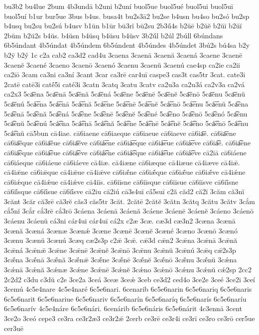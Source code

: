 {bu3b2
bu4lue
2bum
4b3undā
b2uni
b2uní
buol5ue
buol5ué
buol5ui
buol5uī
buol5uí
b1ur
bur5ue
3bus
b4us.
busa4t
bu2s3ā2
bu2se
b4usn
bu4so
bu2só
bu2sp
b4usq
bu2su
bu2sú
b4usv
b1ūn
b1ūr
bū3rĭ
bū2su
2b3ū́4s
b2ŭē
b2ŭĕ
b2ŭī
b2ŭĭ
2bŭm
b2ŭ2s
b4ŭs.
b4ŭsn
b4ŭsq
b4ŭsu
b4ŭsv
3b2ŭ́l
b2úl
2búll
6búndans
6b5úndant
4b5úndat
4b5úndem
6b5úndent
4b5úndes
4b5úndet
3bú2s
bú4sa
b2y
b2ȳ
b2ý
1c
c2a
cab2
ca3d2
cad4u
3caena
3caenā
3caenă
3caená
3caene
3caenē
3caenĕ
3caené
3caeno
3caenō
3caenó
3caenu
3caenŭ
3caenú
cae4sp
ca2ie
ca2ii
ca2iō
3cam
ca3ni
ca3ní
3cant
3car
ca3rē
car4uī
caspe3
cas3t
cas5tr
3cat.
cate3i
2catē
catē3i
catḗ5i
caté3i
3catn
3catq
3catu
3catv
ca2u3a
ca2u3á
ca2v3a
ca2vá
ca2x3
5ca͞ena
5ca͞enā
5ca͞enă
5ca͞ená
5ca͞ene
5ca͞enē
5ca͞enĕ
5ca͞enō
5ca͞enu
5ca͞enŭ
5ca͞enú
5cá͞ena
5cá͞enā
5cá͞enă
5cá͞ene
5cá͞enē
5cá͞enĕ
5cá͞enō
5cá͞enu
5cá͞enŭ
5ca͡ena
5ca͡enā
5ca͡enă
5ca͡ená
5ca͡ene
5ca͡enē
5ca͡enĕ
5ca͡ené
5ca͡eno
5ca͡enō
5ca͡enó
5ca͡enu
5ca͡enŭ
5ca͡enú
5cá͡ena
5cá͡enā
5cá͡enă
5cá͡ene
5cá͡enē
5cá͡enĕ
5cá͡eno
5cá͡enō
5cá͡enu
5cá͡enŭ
cā5bun
cā4iae.
cā6iaene
cā6iaeque
cā6iaeue
cā6iaeve
cā6ia͞e.
cā6ia͞ene
cā6ia͞eque
cā6ia͞eue
cā6ia͞eve
cā6iá͞ene
cā6iá͞eque
cā6iá͞eue
cā6iá͞eve
cā6ia͡e.
cā6ia͡ene
cā6ia͡eque
cā6ia͡eue
cā6ia͡eve
cā6iá͡ene
cā6iá͡eque
cā6iá͡eue
cā6iá͡eve
cā2iā
cā6iáene
cā6iáeque
cā6iáeue
cā6iáeve
cā4iæ.
cā4iæne
cā6iæque
cā4iæue
cā4iæve
cā4iǣ.
cā4iǣne
cā6iǣque
cā4iǣue
cā4iǣve
cā6iǣ́ne
cā6iǣ́que
cā6iǣ́ue
cā6iǣ́ve
cā4iǽne
cā6iǽque
cā4iǽue
cā4iǽve
cā4iīs.
cā6iīsne
cā6iīsque
cā6iīsue
cā6iīsve
cā6iī́sne
cā6iī́sque
cā6iī́sue
cā6iī́sve
cā2iu
cā2iú
cā3s4uī
cā́5suī
c2ă
căd2
că2ĭ
3căm
că3nĭ
3cănt
3căr
că3rē
că3rĕ
căs3
căs5tr
3căt.
2cătē
2cătĕ
3cătn
3cătq
3cătu
3cătv
3cắm
cắ5nĭ
3cắr
cắ3rē
cắ3rō
3cáena
3cáenā
3cáenă
3cáene
3cáenē
3cáenĕ
3cáeno
3cáenō
3cáenu
3cáenŭ
cá3ni
cár4ui
cár4uī
cá2x
c2æ
3cæ.
cæ3d
cæ3n2
3cæna
3cænā
3cænă
3cæná
3cænæ
3cænǽ
3cæne
3cænē
3cænĕ
3cæné
3cæno
3cænō
3cænó
3cænu
3cænŭ
3cænú
3cæq
cæ2s3p
c2ǣ
3cǣ.
cǣ3d
cǣn2
3cǣna
3cǣnā
3cǣnă
3cǣná
3cǣnǣ
3cǣne
3cǣnē
3cǣnĕ
3cǣnō
3cǣnu
3cǣnŭ
3cǣnú
3cǣq
cǣ2s3p
3cǣ́na
3cǣ́nā
3cǣ́nă
3cǣ́nǣ
3cǣ́ne
3cǣ́nē
3cǣ́nĕ
3cǣ́nō
3cǣ́nu
3cǣ́nŭ
3cǽna
3cǽnā
3cǽnă
3cǽnæ
3cǽne
3cǽnē
3cǽnĕ
3cǽno
3cǽnō
3cǽnu
3cǽnŭ
cǽ2sp
2cc2
2c2d2
c3du
c3dŭ
c2e
3ce2a
3ceá
3ceæ
3ceǽ
3ceb
ce3d2
ced4o
3ce2e
3ceé
3ce2i
3ceí
3cemú
4c5e4nare
4c5e4naré
6c5e6nari.
6cenarib
6c5e6narin
6c5e6nariq
6c5e6naris
6c5e6narit
6c5e6nariue
6c5e6nariv
6c5e6narín
6c5e6naríq
6c5e6narís
6c5e6naríu
6c5e6narív
4c5e4náre
6c5e6nári.
6cenárib
6c5e6náris
6c5e6nárit
4c3ennā
3cent
3ce2o
3ceó
cepe3
ce3ra
ce3r2æ3
ce3r2ǣ
2cerb
ce3rē
ce3r4i
ce3rī
ce3ro
ce3rō
cer5ue
cer3uē
}

